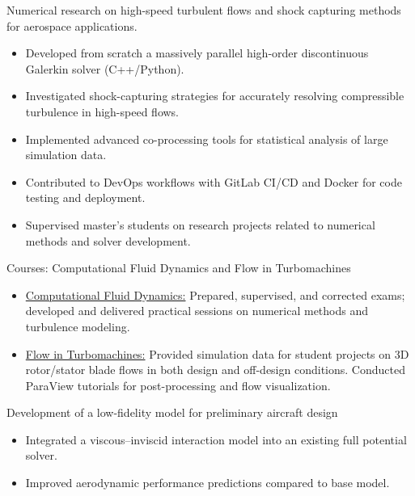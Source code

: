 \documentclass[10pt,a4paper,ragged2e,withhyper]{altacv}
\begin{document}

\textcolor{myRed}{Numerical research on high-speed turbulent flows and shock capturing methods for aerospace applications.}
\begin{itemize}[leftmargin=1.5em]
  \item Developed from scratch a massively parallel high-order discontinuous Galerkin solver (C++/Python).
  \item Investigated shock-capturing strategies for accurately resolving compressible turbulence in high-speed flows.
  \item Implemented advanced co-processing tools for statistical analysis of large simulation data.
  \item Contributed to DevOps workflows with GitLab CI/CD and Docker for code testing and deployment.
  \item Supervised master's students on research projects related to numerical methods and solver development.
\end{itemize}

\divider

\textcolor{myRed}{Courses: Computational Fluid Dynamics and Flow in Turbomachines}
\begin{itemize}[leftmargin=1.5em]
  \item \href{https://www.programmes.uliege.be/cocoon/20242025/cours/AERO0030-1.html}{Computational Fluid Dynamics:} Prepared, supervised, and corrected exams; developed and delivered practical sessions on numerical methods and turbulence modeling.
  \item \href{https://www.programmes.uliege.be/cocoon/20242025/cours/MECA0032-1.html}{Flow in Turbomachines:} Provided simulation data for student projects on 3D rotor/stator blade flows in both design and off-design conditions. Conducted ParaView tutorials for post-processing and flow visualization.
\end{itemize}

\divider

\textcolor{myRed}{Development of a low-fidelity model for preliminary aircraft design}
\begin{itemize}[leftmargin=1.5em]
    \item Integrated a viscous–inviscid interaction model into an existing full potential solver.
    \item Improved aerodynamic performance predictions compared to base model.
\end{itemize}
\end{document}
